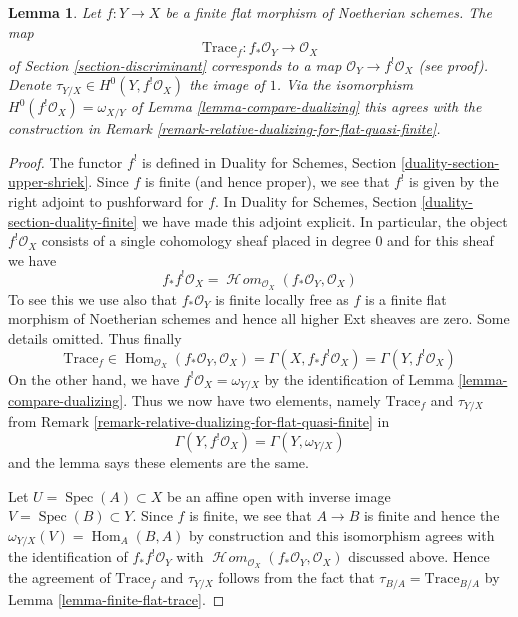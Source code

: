 \documentclass{stacks-project}
\theoremstyle{plain}
\newtheorem{lemma}[subsection]{Lemma}
\theoremstyle{definition}
\theoremstyle{remark}
\numberwithin{equation}{subsection}
\def\Spec{\mathop{\mathrm{Spec}}}
\def\Hom{\mathop{\mathrm{Hom}}\nolimits}
\def\SheafHom{\mathop{\mathcal{H}\!\mathit{om}}\nolimits}
\begin{document}
\begin{lemma}
\label{lemma-compare-trace}
Let $f : Y \to X$ be a finite flat morphism of Noetherian schemes.
The map
$$
\text{Trace}_f : f_*\mathcal{O}_Y \longrightarrow \mathcal{O}_X
$$
of Section \ref{section-discriminant}
corresponds to a map $\mathcal{O}_Y \to f^!\mathcal{O}_X$ (see proof).
Denote $\tau_{Y/X} \in H^0(Y, f^!\mathcal{O}_X)$ the image of $1$.
Via the isomorphism $H^0(f^!\mathcal{O}_X) = \omega_{X/Y}$ of
Lemma \ref{lemma-compare-dualizing}
this agrees with the construction in
Remark \ref{remark-relative-dualizing-for-flat-quasi-finite}.
\end{lemma}

\begin{proof}
The functor $f^!$ is defined in 
Duality for Schemes, Section \ref{duality-section-upper-shriek}.
Since $f$ is finite (and hence proper), we see that $f^!$ is given by
the right adjoint to pushforward for $f$. In
Duality for Schemes, Section \ref{duality-section-duality-finite}
we have made this adjoint explicit. In particular,
the object $f^!\mathcal{O}_X$ consists of a single
cohomology sheaf placed in degree $0$ and for this sheaf we have
$$
f_*f^!\mathcal{O}_X =
\SheafHom_{\mathcal{O}_X}(f_*\mathcal{O}_Y, \mathcal{O}_X)
$$
To see this we use also that $f_*\mathcal{O}_Y$ is finite locally free
as $f$ is a finite flat morphism of Noetherian schemes
and hence all higher Ext sheaves are zero. Some details omitted.
Thus finally
$$
\text{Trace}_f \in
\Hom_{\mathcal{O}_X}(f_*\mathcal{O}_Y, \mathcal{O}_X) =
\Gamma(X, f_*f^!\mathcal{O}_X) =
\Gamma(Y, f^!\mathcal{O}_X)
$$
On the other hand, we have $f^!\mathcal{O}_X = \omega_{Y/X}$
by the identification of Lemma \ref{lemma-compare-dualizing}.
Thus we now have two elements, namely $\text{Trace}_f$
and $\tau_{Y/X}$ from
Remark \ref{remark-relative-dualizing-for-flat-quasi-finite} in
$$
\Gamma(Y, f^!\mathcal{O}_X) = \Gamma(Y, \omega_{Y/X})
$$
and the lemma says these elements are the same.

\medskip\noindent
Let $U = \Spec(A) \subset X$ be an affine open with inverse image
$V = \Spec(B) \subset Y$. Since $f$ is finite, we see that
$A \to B$ is finite and hence the $\omega_{Y/X}(V) = \Hom_A(B,A)$
by construction and this isomorphism agrees with the identification
of $f_*f^!\mathcal{O}_Y$ with
$\SheafHom_{\mathcal{O}_X}(f_*\mathcal{O}_Y, \mathcal{O}_X)$ discussed
above. Hence the agreement of $\text{Trace}_f$ and $\tau_{Y/X}$
follows from the fact that $\tau_{B/A} = \text{Trace}_{B/A}$
by Lemma \ref{lemma-finite-flat-trace}.
\end{proof}
\end{document}
